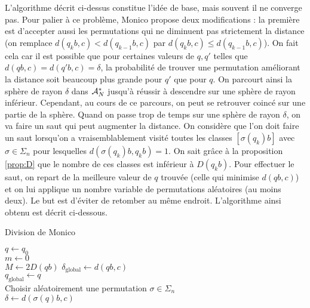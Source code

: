 L'algorithme décrit ci-dessus constitue l'idée de base, mais souvent il ne converge pas. Pour palier à ce problème, Monico propose deux modifications : la première est d'accepter aussi les permutations qui ne diminuent pas strictement la distance (on remplace $d(q_kb, c) < d(q_{k-1}b, c)$ par $d(q_kb, c) \leq d(q_{k-1}b, c)$). On fait cela car il est possible que pour certaines valeurs de $q,q'$ telles que $d(qb,c)=d(q'b,c)=\delta$, la probabilité de trouver une permutation améliorant la distance soit beaucoup plus grande pour $q'$ que pour $q$. On parcourt ainsi la sphère de rayon $\delta$ dans $\mathcal{A}_N^*$ jusqu'à réussir à descendre sur une sphère de rayon inférieur. Cependant, au cours de ce parcours, on peut se retrouver coincé sur une partie de la sphère. Quand on passe trop de temps sur une sphère de rayon $\delta$, on va faire un saut qui peut augmenter la distance. On considère que l'on doit faire un saut lorsqu'on a vraisemblablement visité toutes les classes $[\sigma(q_k)b]$ avec $\sigma \in \Sigma_n$ pour lesquelles $d(\sigma(q_k)b, q_kb)=1$. On sait grâce à la proposition \ref{prop:D} que le nombre de ces classes est inférieur à $D(q_kb)$. Pour effectuer le saut, on repart de la meilleure valeur de $q$ trouvée (celle qui minimise $d(qb,c)$) et on lui applique un nombre variable de permutations aléatoires (au moins deux). Le but est d'éviter de retomber au même endroit. L'algorithme ainsi obtenu est décrit ci-dessous.

\begin{algorithm}
	\caption{Division de Monico} \label{alg:mon1}
	$q \gets q_0$ \\
	$m \gets 0$ \\
	$M \gets 2D(qb)$ 
	$\delta_{\text{global}} \gets d(qb,c)$ \\
	$q_{\text{global}} \gets q$ \\
	{
		Choisir aléatoirement une permutation $\sigma \in \Sigma_n$ \\
		$\delta \gets d(\sigma(q)b,c)$ \\
		\Si{$\delta > d(qb,c)$ et $m > M$}{
			\tcc{Saut}
			$m \gets 0$ \\
			$q \gets q_{\text{global}}$ \\
			Choisir aléatoirement $\sigma \in \Sigma_n$ \\
			$q \gets \sigma(q)$ \\
			\Repeter{$x<1/2$}{
				Choisir aléatoirement $\sigma \in \Sigma_n$ \\
				choisir aléatoirement $x \in [0;1[$
			}
		}
	}
\end{algorithm}

